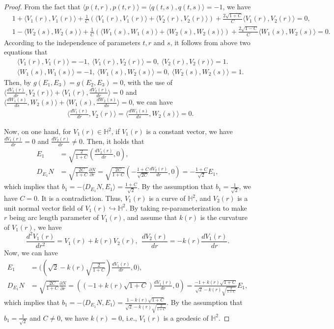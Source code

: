 \documentclass[reqno]{amsart}%
\theoremstyle{definition}
\numberwithin{equation}{section}
\begin{document}
\begin{proof}
From the fact that $\langle p(t,r),p(t,r)\rangle=\langle q(t,s),q(t,s)\rangle=-1$, we have
$$
\begin{aligned}
&1+\langle V_1(r),V_1(r)\rangle+\tfrac{1}{C}(\langle V_1(r),V_1(r)\rangle+\langle V_2(r),V_2(r)\rangle)
+\tfrac{2\sqrt{1+C}}{C}\langle V_1(r),V_2(r)\rangle=0,\\
&1-\langle W_2(s),W_2(s)\rangle+\tfrac{1}{C}(\langle W_1(s),W_1(s)\rangle+\langle W_2(s),W_2(s)\rangle)
+\tfrac{2\sqrt{1-C}}{C}\langle W_1(s),W_2(s)\rangle=0.
\end{aligned}
$$
According to the independence of parameters $t,r$ and $s$, it follows from above two equations that
$$
\begin{aligned}
&\langle V_1(r),V_1(r)\rangle=-1,\ \langle V_1(r),V_2(r)\rangle=0,\ \langle V_2(r),V_2(r)\rangle=1.\\
&\langle W_1(s),W_1(s)\rangle=-1,\ \langle W_1(s),W_2(s)\rangle=0,\ \langle W_2(s),W_2(s)\rangle=1.
\end{aligned}
$$
Then, by $g(E_1,E_3)=g(E_2,E_3)=0$,
with the use of $\langle \frac{dV_1(r)}{dr},V_2(r)\rangle+\langle V_1(r),\frac{dV_2(r)}{dr}\rangle=0$
and $\langle \frac{dW_1(s)}{ds},W_2(s)\rangle+\langle W_1(s),\frac{dW_2(s)}{ds}\rangle=0$,
we can have
$$
\begin{aligned}
&\langle \frac{d V_1(r)}{dr},V_2(r)\rangle=\langle \frac{d W_1(s)}{ds},W_2(s)\rangle=0.
\end{aligned}
$$

Now, on one hand, for $V_1(r)\in \mathbb{H}^2$, if $V_1(r)$ is a constant vector, we have
$\frac{d V_1(r)}{dr}=0$ and $\frac{d V_2(r)}{dr}\neq0$. Then, it holds that
$$
\begin{aligned}
E_1&=\sqrt{\tfrac{2}{1+C}}(\tfrac{d V_2(r)}{d r},0),\\
D_{E_1}N&=\sqrt{\tfrac{2C}{1+C}}\tfrac{\partial N}{\partial r}=
\sqrt{\tfrac{2C}{1+C}}(-\tfrac{1+C}{\sqrt{2C}}\tfrac{d V_2(r)}{d r},0)=-\tfrac{1+C}{\sqrt{2}}E_1,
\end{aligned}
$$
which implies that $b_1=-\langle D_{E_1}N,E_1\rangle=\frac{1+C}{\sqrt{2}}$.
By the assumption that $b_1=\frac{1}{\sqrt{2}}$, we have $C=0$. It is a contradiction.
Thus, $V_1(r)$ is a curve of $\mathbb{H}^2$,
and $V_2(r)$ is a unit normal vector field of $V_1(r)\hookrightarrow\mathbb{H}^2$.
By taking re-parameterization to make $r$ being arc length parameter of $V_1(r)$, and assume that
$k(r)$ is the curvature of $V_1(r)$, we have
$$
\frac{d^2V_1(r)}{dr^2}=V_1(r)+k(r)V_2(r), \ \
\frac{dV_2(r)}{dr}=-k(r)\frac{dV_1(r)}{dr}.
$$
Now, we can have
$$
\begin{aligned}
E_1&=\Big((\sqrt{2}-k(r)\sqrt{\tfrac{2}{1+C}})\tfrac{d V_1(r)}{dr},0\Big),\\
D_{E_1}N&=\sqrt{\tfrac{2C}{1+C}}\tfrac{\partial N}{\partial r}=
((-1+k(r)\sqrt{1+C})\tfrac{d V_1(r)}{d r},0)=\tfrac{-1+k(r)\sqrt{1+C}}{\sqrt{2}-k(r)\sqrt{\tfrac{2}{1+C}}}E_1,
\end{aligned}
$$
which implies that $b_1=-\langle D_{E_1}N,E_1\rangle=\frac{1-k(r)\sqrt{1+C}}{\sqrt{2}-k(r)\sqrt{\frac{2}{1+C}}}$.
By the assumption that $b_1=\frac{1}{\sqrt{2}}$ and $C\neq0$, we have $k(r)=0$,
i.e., $V_1(r)$ is a geodesic of $\mathbb{H}^2$.


\end{proof}
\end{document}
